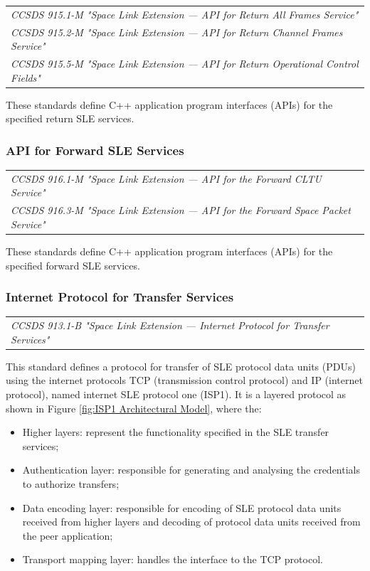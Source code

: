 \begin{tabular}{l}
\textit{CCSDS 915.1-M "Space Link Extension — API for Return All Frames Service" \cite{CCSDS-915.1-M}} \\
\textit{CCSDS 915.2-M "Space Link Extension — API for Return Channel Frames Service" \cite{CCSDS-915.2-M}} \\
\textit{CCSDS 915.5-M "Space Link Extension — API for Return Operational Control Fields" \cite{CCSDS-915.5-M}} \\
\end{tabular}

These standards define C++ application program interfaces (APIs) for the specified return SLE services.

\subsubsection{API for Forward SLE Services}

\begin{tabular}{l}
\textit{CCSDS 916.1-M "Space Link Extension — API for the Forward CLTU Service" \cite{CCSDS-916.1-M}} \\
\textit{CCSDS 916.3-M "Space Link Extension — API for the Forward Space Packet Service" \cite{CCSDS-916.3-M}} \\
\end{tabular}

These standards define C++ application program interfaces (APIs) for the specified forward SLE services.

\subsubsection{Internet Protocol for Transfer Services}

\begin{tabular}{l}
\textit{CCSDS 913.1-B "Space Link Extension — Internet Protocol for Transfer Services" \cite{CCSDS-913.1-B}} \\
\end{tabular}

This standard defines a protocol for transfer of SLE protocol data units (PDUs) using the internet protocols TCP (transmission control protocol) and IP (internet protocol), named internet SLE protocol one (ISP1). It is a layered protocol as shown in Figure \ref{fig:ISP1 Architectural Model}, where the:

\begin{itemize}
\item Higher layers: represent the functionality specified in the SLE transfer services;
\item Authentication layer: responsible for generating and analysing the credentials to authorize transfers;
\item Data encoding layer: responsible for encoding of SLE protocol data units received from higher layers and decoding of protocol data units received from the peer application;
\item Transport mapping layer: handles the interface to the TCP protocol.
\end{itemize}


